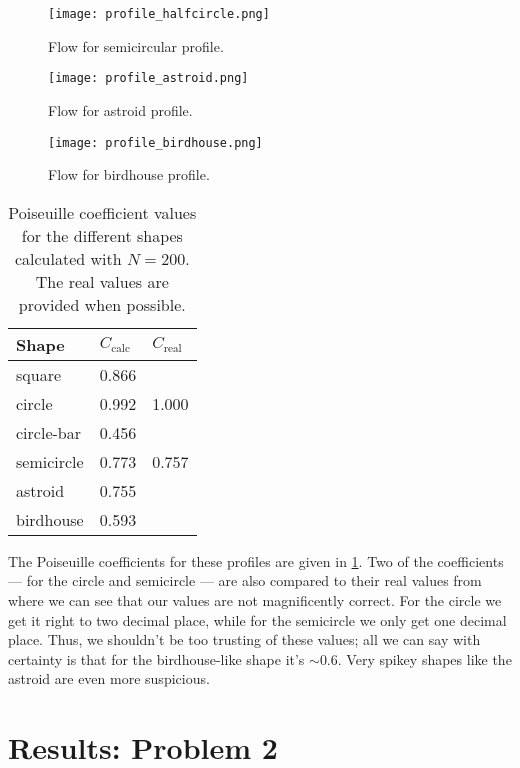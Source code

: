 \documentclass[10pt,a4paper,twocolumn]{article}
\begin{document}
\begin{figure}[!ht]
    \centering
    \texttt{[image: profile\_halfcircle.png]}
    \caption{Flow for semicircular profile.}
    \label{fig:profile_halfcircle}
\end{figure}

\begin{figure}[!h]
    \centering
    \texttt{[image: profile\_astroid.png]}
    \caption{Flow for astroid profile.}
    \label{fig:profile_astroid}
\end{figure}

\begin{figure}[!hb]
    \centering
    \texttt{[image: profile\_birdhouse.png]}
    \caption{Flow for birdhouse profile.}
    \label{fig:profile_birdhouse}
\end{figure}

\newpage

\begin{table}
    \centering
    \begin{tabular}{|l|l|l|}
    \hline
    Shape & $C_{\mathrm{calc}}$ & $C_{\mathrm{real}}$ \\ \hline \hline
    square  & 0.866 &  \\ \hline
    circle  & 0.992 & 1.000 \\ \hline
    circle-bar  & 0.456 &  \\ \hline
    semicircle  & 0.773 & 0.757 \\ \hline
    astroid  & 0.755 &  \\ \hline
    birdhouse  & 0.593 &  \\ \hline
    \end{tabular}
    \caption{Poiseuille coefficient values for the different shapes calculated with $N = 200$. The real values are provided when possible.}
    \label{tab:vals}
\end{table}

The Poiseuille coefficients for these profiles are given in \cref{tab:vals}. Two of the coefficients --- for the circle and semicircle --- are also compared to their real values from where we can see that our values are not magnificently correct. For the circle we get it right to two decimal place, while for the semicircle we only get one decimal place. Thus, we shouldn't be too trusting of these values; all we can say with certainty is that for the birdhouse-like shape it's $\sim\!0.6$. Very spikey shapes like the astroid are even more suspicious.

\section{Results: Problem 2}
\end{document}
